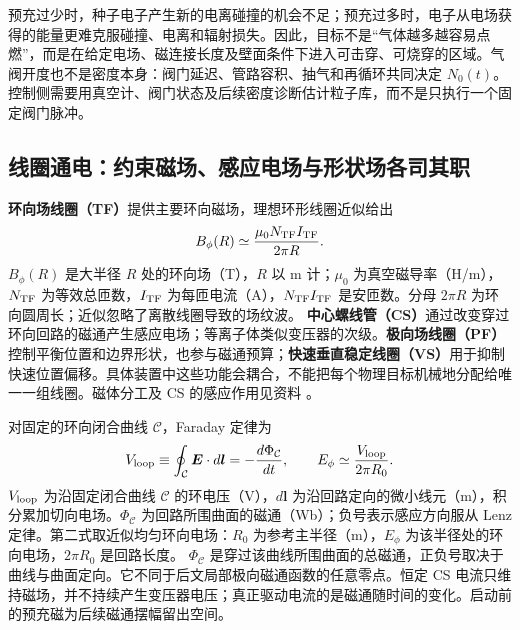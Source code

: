 \documentclass[12pt,fontset=none]{ctexart}
\numberwithin{equation}{section}
\numberwithin{table}{section}
\numberwithin{figure}{section}
\begin{document}
预充过少时，种子电子产生新的电离碰撞的机会不足；预充过多时，电子从电场获得的能量更难克服碰撞、电离和辐射损失。因此，目标不是``气体越多越容易点燃''，而是在给定电场、磁连接长度及壁面条件下进入可击穿、可烧穿的区域。气阀开度也不是密度本身：阀门延迟、管路容积、抽气和再循环共同决定 $N_0(t)$。控制侧需要用真空计、阀门状态及后续密度诊断估计粒子库，而不是只执行一个固定阀门脉冲。

\subsection{线圈通电：约束磁场、感应电场与形状场各司其职}\label{sec:cycle-coils}

\textbf{环向场线圈（TF）}提供主要环向磁场，理想环形线圈近似给出
\begin{equation}\label{eq:cycle-tf}
 B_\phi(R)\simeq\frac{\mu_0N_{\rm TF}I_{\rm TF}}{2\pi R}.
\end{equation}
$B_\phi(R)$ 是大半径 $R$ 处的环向场（T），$R$ 以 m 计；$\mu_0$ 为真空磁导率（H/m），$N_{\rm TF}$ 为等效总匝数，$I_{\rm TF}$ 为每匝电流（A），$N_{\rm TF}I_{\rm TF}$ 是安匝数。分母 $2\pi R$ 为环向圆周长；近似忽略了离散线圈导致的场纹波。
\textbf{中心螺线管（CS）}通过改变穿过环向回路的磁通产生感应电场；等离子体类似变压器的次级。\textbf{极向场线圈（PF）}控制平衡位置和边界形状，也参与磁通预算；\textbf{快速垂直稳定线圈（VS）}用于抑制快速位置偏移。具体装置中这些功能会耦合，不能把每个物理目标机械地分配给唯一一组线圈。磁体分工及 CS 的感应作用见资料 \cite{C2,C3}。

对固定的环向闭合曲线 $\mathcal C$，Faraday 定律为
\begin{equation}\label{eq:cycle-faraday}
 V_{\rm loop}\equiv\oint_{\mathcal C}\bm E\cdot d\bm l
 =-\frac{d\Phi_{\mathcal C}}{dt},
 \qquad E_\phi\simeq\frac{V_{\rm loop}}{2\pi R_0}.
\end{equation}
$V_{\rm loop}$ 为沿固定闭合曲线 $\mathcal C$ 的环电压（V），$d\bm l$ 为沿回路定向的微小线元（m），积分累加切向电场。$\Phi_{\mathcal C}$ 为回路所围曲面的磁通（Wb）；负号表示感应方向服从 Lenz 定律。第二式取近似均匀环向电场：$R_0$ 为参考主半径（m），$E_\phi$ 为该半径处的环向电场，$2\pi R_0$ 是回路长度。
$\Phi_{\mathcal C}$ 是穿过该曲线所围曲面的总磁通，正负号取决于曲线与曲面定向。它不同于后文局部极向磁通函数的任意零点。恒定 CS 电流只维持磁场，并不持续产生变压器电压；真正驱动电流的是磁通随时间的变化。启动前的预充磁为后续磁通摆幅留出空间。
\end{document}
